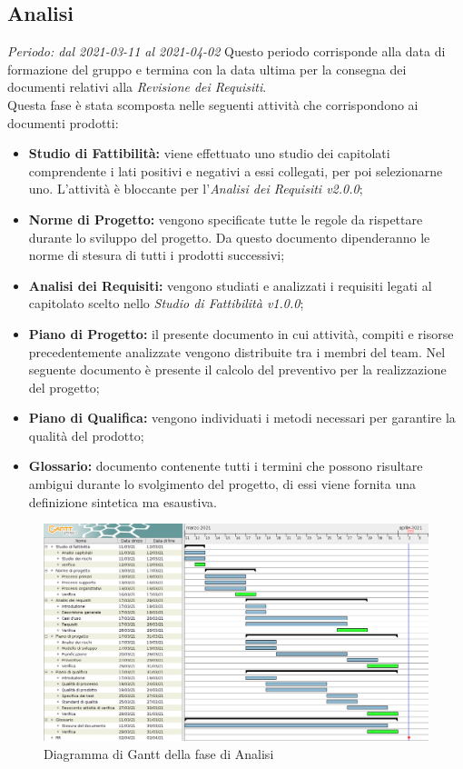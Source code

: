 \subsection{Analisi}
\textit{Periodo: dal 2021-03-11 al 2021-04-02}
Questo periodo corrisponde alla data di formazione del gruppo e termina con la data ultima per la consegna dei documenti relativi alla \textit{Revisione dei Requisiti}.\\
Questa fase è stata scomposta nelle seguenti attività che corrispondono ai documenti prodotti:
\begin{itemize}
    \item \textbf{Studio di Fattibilità:} viene effettuato uno studio dei capitolati comprendente i lati positivi e negativi a essi collegati, per poi selezionarne uno. L'attività è bloccante per l'\textit{Analisi dei Requisiti v2.0.0};
    \item \textbf{Norme di Progetto:} vengono specificate tutte le regole da rispettare durante lo sviluppo del progetto. Da questo documento dipenderanno le norme di stesura di tutti i prodotti successivi;
    \item \textbf{Analisi dei Requisiti:} vengono studiati e analizzati i requisiti legati al capitolato scelto nello \textit{Studio di Fattibilità v1.0.0};
    \item \textbf{Piano di Progetto:} il presente documento in cui attività, compiti e risorse precedentemente analizzate vengono distribuite tra i membri del team. Nel seguente documento è presente il calcolo del preventivo per la realizzazione del progetto;
    \item \textbf{Piano di Qualifica:} vengono individuati i metodi necessari per garantire la qualità del prodotto;
    \item \textbf{Glossario:} documento contenente tutti i termini che possono risultare ambigui durante lo svolgimento del progetto, di essi viene fornita una definizione sintetica ma esaustiva.
\end{itemize}
\begin{figure}[!ht]
    \caption{Diagramma di Gantt della fase di Analisi}
    \vspace{5px}
    \includegraphics[scale=0.21]{../../../Images/Diagrammi/Gantt/diagramma_gantt_analisi_0.2.png}
    \centering
\end{figure}

